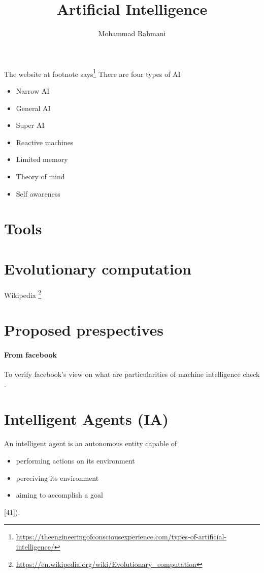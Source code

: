 \documentclass{article}
\begin{document}
	
	\title{Artificial Intelligence}
	\author{Mohammad Rahmani}
	\date{}
	\maketitle
	
	The website at footnote says\footnote{\url{https://theengineeringofconsciousexperience.com/types-of-artificial-intelligence/}} There are four types of AI
	\begin{itemize}
		\item Narrow AI
		\item General AI
		\item Super AI
		\item Reactive machines
		\item Limited memory
		\item Theory of mind
		\item Self awareness
	\end{itemize}
	
	\section{Tools}
		\section{Evolutionary computation}
		Wikipedia \footnote{\url{https://en.wikipedia.org/wiki/Evolutionary_computation}}
	\section{Proposed prespectives}
		\paragraph{From facebook}To verify facebook's view on what are particularities of machine intelligence check \cite{mikolov-2016-a-roadmap-towards-machine-intelligence}.
	
	\section{Intelligent Agents (IA)}
	 An intelligent agent is an autonomous entity capable of 
	 \begin{itemize}
	 	\item performing actions on its environment
	 	\item perceiving its environment
	 	\item aiming to accomplish a goal
	 \end{itemize}
	  \citet{rizk-2018-decision-making-in-multiagent-systems-a-survey} [41]). 
	 
\end{document}
